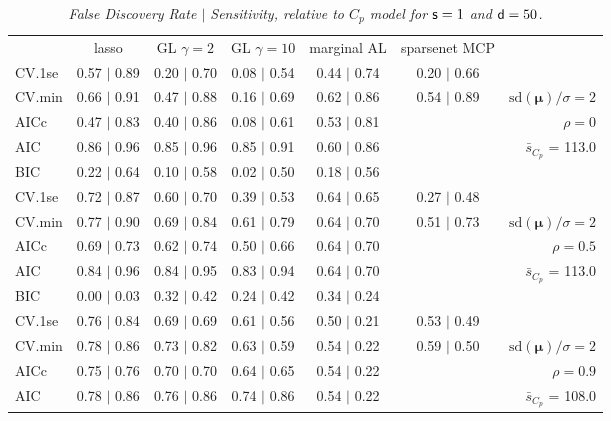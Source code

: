 \documentclass[12pt]{article}
\newcommand{\mr}[1]{\mathrm{#1}}
\newcommand{\bm}[1]{\mathbf{#1}}
\begin{document}
\begin{table}[p]\vspace{-.5cm}
\caption[l]{\label{sens}\it False Discovery Rate $\mid$ Sensitivity, relative to $C_p$ model  for ${\sf s}=1$ and ${\sf d}=50$.}
\vspace{-.5cm}
\small{}
\begin{center}
\begin{tabular}{l*{5}{c}|r}
 & lasso & GL $\gamma=2$ & GL $\gamma=10$ & marginal AL & sparsenet MCP  & \\
 \cline{1-7}
CV.1se & 0.57 $\mid$ 0.89 & 0.20 $\mid$ 0.70 & 0.08 $\mid$ 0.54 & 0.44 $\mid$ 0.74 & 0.20 $\mid$ 0.66 &\\
CV.min & 0.66 $\mid$ 0.91 & 0.47 $\mid$ 0.88 & 0.16 $\mid$ 0.69 & 0.62 $\mid$ 0.86 & 0.54 $\mid$ 0.89 &  $\mr{sd}(\bm{\mu})/\sigma=2$ \\
AICc & 0.47 $\mid$ 0.83 & 0.40 $\mid$ 0.86 & 0.08 $\mid$ 0.61 & 0.53 $\mid$ 0.81 & & $\rho=0$ \\
AIC & 0.86 $\mid$ 0.96 & 0.85 $\mid$ 0.96 & 0.85 $\mid$ 0.91 & 0.60 $\mid$ 0.86 & & \multirow{2}{*}{$\bar{s}_{C_p}$ = 113.0} \\
BIC & 0.22 $\mid$ 0.64 & 0.10 $\mid$ 0.58 & 0.02 $\mid$ 0.50 & 0.18 $\mid$ 0.56 & & \\
 \hline 
CV.1se & 0.72 $\mid$ 0.87 & 0.60 $\mid$ 0.70 & 0.39 $\mid$ 0.53 & 0.64 $\mid$ 0.65 & 0.27 $\mid$ 0.48 &\\
CV.min & 0.77 $\mid$ 0.90 & 0.69 $\mid$ 0.84 & 0.61 $\mid$ 0.79 & 0.64 $\mid$ 0.70 & 0.51 $\mid$ 0.73 &  $\mr{sd}(\bm{\mu})/\sigma=2$ \\
AICc & 0.69 $\mid$ 0.73 & 0.62 $\mid$ 0.74 & 0.50 $\mid$ 0.66 & 0.64 $\mid$ 0.70 & & $\rho=0.5$ \\
AIC & 0.84 $\mid$ 0.96 & 0.84 $\mid$ 0.95 & 0.83 $\mid$ 0.94 & 0.64 $\mid$ 0.70 & & \multirow{2}{*}{$\bar{s}_{C_p}$ = 113.0} \\
BIC & 0.00 $\mid$ 0.03 & 0.32 $\mid$ 0.42 & 0.24 $\mid$ 0.42 & 0.34 $\mid$ 0.24 & & \\
 \hline 
CV.1se & 0.76 $\mid$ 0.84 & 0.69 $\mid$ 0.69 & 0.61 $\mid$ 0.56 & 0.50 $\mid$ 0.21 & 0.53 $\mid$ 0.49 &\\
CV.min & 0.78 $\mid$ 0.86 & 0.73 $\mid$ 0.82 & 0.63 $\mid$ 0.59 & 0.54 $\mid$ 0.22 & 0.59 $\mid$ 0.50 &  $\mr{sd}(\bm{\mu})/\sigma=2$ \\
AICc & 0.75 $\mid$ 0.76 & 0.70 $\mid$ 0.70 & 0.64 $\mid$ 0.65 & 0.54 $\mid$ 0.22 & & $\rho=0.9$ \\
AIC & 0.78 $\mid$ 0.86 & 0.76 $\mid$ 0.86 & 0.74 $\mid$ 0.86 & 0.54 $\mid$ 0.22 & & \multirow{2}{*}{$\bar{s}_{C_p}$ = 108.0} \\

\end{tabular}
\end{center}
\end{table}
\end{document}
